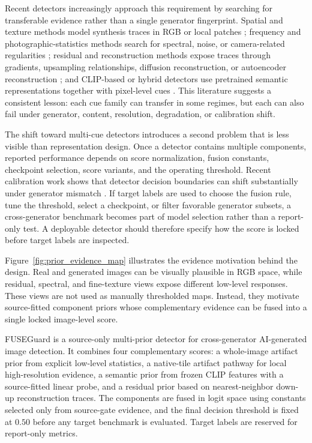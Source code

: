 \documentclass[letterpaper,journal]{IEEEtran}
\begin{document}
Recent detectors increasingly approach this requirement by searching for transferable evidence rather than a single generator fingerprint. Spatial and texture methods model synthesis traces in RGB or local patches \cite{wang2020cnnspot,liu2020gramnet,zhong2023patchcraft}; frequency and photographic-statistics methods search for spectral, noise, or camera-related regularities \cite{frank2020frequency,liu2022realimages,karageorgiou2025spai,zhong2025beyond}; residual and reconstruction methods expose traces through gradients, upsampling relationships, diffusion reconstruction, or autoencoder reconstruction \cite{tan2023lgrad,tan2024npr,wang2023dire,ricker2024aeroblade}; and CLIP-based or hybrid detectors use pretrained semantic representations together with pixel-level cues \cite{radford2021clip,ojha2023univfd,cozzolino2024clip,yan2025aide,cheng2025cospy}. This literature suggests a consistent lesson: each cue family can transfer in some regimes, but each can also fail under generator, content, resolution, degradation, or calibration shift.

The shift toward multi-cue detectors introduces a second problem that is less visible than representation design. Once a detector contains multiple components, reported performance depends on score normalization, fusion constants, checkpoint selection, score variants, and the operating threshold. Recent calibration work shows that detector decision boundaries can shift substantially under generator mismatch \cite{yang2026calibrated}. If target labels are used to choose the fusion rule, tune the threshold, select a checkpoint, or filter favorable generator subsets, a cross-generator benchmark becomes part of model selection rather than a report-only test. A deployable detector should therefore specify how the score is locked before target labels are inspected.

Figure~\ref{fig:prior_evidence_map} illustrates the evidence motivation behind the design. Real and generated images can be visually plausible in RGB space, while residual, spectral, and fine-texture views expose different low-level responses. These views are not used as manually thresholded maps. Instead, they motivate source-fitted component priors whose complementary evidence can be fused into a single locked image-level score.

FUSEGuard is a source-only multi-prior detector for cross-generator AI-generated image detection. It combines four complementary scores: a whole-image artifact prior from explicit low-level statistics, a native-tile artifact pathway for local high-resolution evidence, a semantic prior from frozen CLIP features with a source-fitted linear probe, and a residual prior based on nearest-neighbor down-up reconstruction traces. The components are fused in logit space using constants selected only from source-gate evidence, and the final decision threshold is fixed at $0.50$ before any target benchmark is evaluated. Target labels are reserved for report-only metrics.
\end{document}

